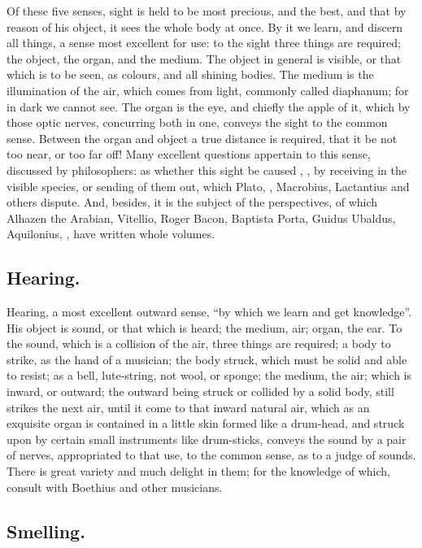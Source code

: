 Of these five senses, sight is held to be most precious, and the best, and that
by reason of his object, it sees the whole body at once. By it we learn, and
discern all things, a sense most excellent for use: to the sight three things
are required; the object, the organ, and the medium. The object in general is
visible, or that which is to be seen, as colours, and all shining bodies. The
medium is the illumination of the air, which comes from
light, commonly called diaphanum; for in dark we cannot
see. The organ is the eye, and chiefly the apple of it, which by those optic
nerves, concurring both in one, conveys the sight to the common sense. Between
the organ and object a true distance is required, that it be not too near, or
too far off! Many excellent questions appertain to this sense, discussed by
philosophers: as whether this sight be caused , \etc{}, by receiving in the visible species, or sending of them out,
which Plato, \Plutarch{},
Macrobius, Lactantius and others
dispute. And, besides, it is the subject of the perspectives, of which Alhazen
the Arabian, Vitellio, Roger Bacon, Baptista Porta, Guidus Ubaldus, Aquilonius,
\etc{}, have written whole volumes.

\subsection{Hearing.}

Hearing, a most excellent outward sense, \enquote{by which we learn and get knowledge}.
His object is sound, or that which is heard; the medium, air; organ, the ear.
To the sound, which is a collision of the air, three things are required; a
body to strike, as the hand of a musician; the body struck, which must be solid
and able to resist; as a bell, lute-string, not wool, or sponge; the medium,
the air; which is inward, or outward; the outward being struck or collided by a
solid body, still strikes the next air, until it come to that inward natural
air, which as an exquisite organ is contained in a little skin formed like a
drum-head, and struck upon by certain small instruments like drum-sticks,
conveys the sound by a pair of nerves, appropriated to that use, to the common
sense, as to a judge of sounds. There is great variety and much delight in
them; for the knowledge of which, consult with Boethius and other musicians.

\subsection{Smelling.}

